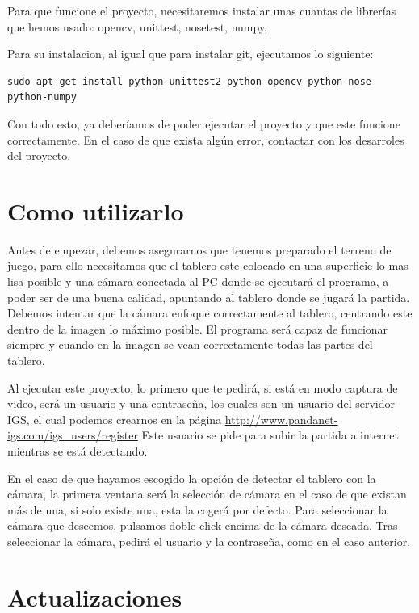 \documentclass[12pt,a4paper]{report}
\begin{document}
Para que funcione el proyecto, necesitaremos instalar unas cuantas de librerías
que hemos usado: opencv, unittest, nosetest, numpy, 

Para su instalacion, al igual que para instalar git, ejecutamos lo siguiente:

\begin{verbatim}
sudo apt-get install python-unittest2 python-opencv python-nose python-numpy
\end{verbatim}

Con todo esto, ya deberíamos de poder ejecutar el proyecto y que este funcione
correctamente. En el caso de que exista algún error, contactar con los
desarroles del proyecto. 


\section{Como utilizarlo}

Antes de empezar, debemos asegurarnos que tenemos preparado el terreno de juego,
para ello necesitamos que el tablero este colocado en una superficie lo mas lisa
posible y una cámara conectada al PC donde se ejecutará el programa, a poder
ser de una buena calidad, apuntando al tablero donde se jugará la partida.
Debemos intentar que la cámara enfoque correctamente al tablero, centrando este
dentro de la imagen lo máximo posible. El programa será capaz de funcionar
siempre y cuando en la imagen se vean correctamente todas las partes del
tablero.

Al ejecutar este proyecto, lo primero que te pedirá, si está en modo captura de
video, será un usuario y una contraseña, los cuales son un usuario del servidor
IGS, el cual podemos crearnos en la página 
\url{http://www.pandanet-igs.com/igs_users/register}
Este usuario se pide para subir la partida a internet mientras se está
detectando. 

En el caso de que hayamos escogido la opción de detectar el tablero con la
cámara, la primera ventana será la selección de cámara en el caso de que existan
más de una, si solo existe una, esta la cogerá por defecto. Para seleccionar la
cámara que deseemos, pulsamos doble click encima de la cámara deseada.  Tras
seleccionar la cámara, pedirá el usuario y la contraseña, como en el caso
anterior. 


\section{Actualizaciones}
\end{document}
